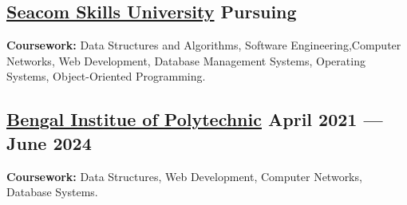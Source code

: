 {\color{black}
\subsection{{\href{https://www.aecwb.edu.in}{Seacom Skills University} \hfill Pursuing}}

\vspace{0.25em}
\subtext{}\textbf{Coursework:} Data Structures and Algorithms, Software Engineering,Computer Networks, Web Development, Database Management Systems, Operating Systems, Object-Oriented Programming.
\vspace{0.2em}
}

{\color{black}
\subsection{{\href{https://bcrp.ac.in/}{Bengal Institue of Polytechnic} \hfill April 2021 --- June 2024}}

\vspace{0.25em}
\subtext{}\textbf{Coursework:} Data Structures, Web Development, Computer Networks, Database Systems.
\vspace{0.2em}
}